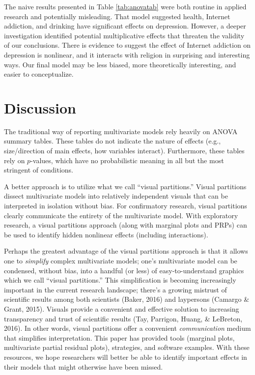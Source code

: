 \documentclass[
  man,floatsintext]{apa6}
\begin{document}
The naive results presented in Table \ref{tab:anovatab} were both routine in applied research and potentially misleading. That model suggested health, Internet addiction, and drinking have significant effects on depression. However, a deeper investigation identified potential multiplicative effects that threaten the validity of our conclusions. There is evidence to suggest the effect of Internet addiction on depression is nonlinear, and it interacts with religion in surprising and interesting ways. Our final model may be less biased, more theoretically interesting, and easier to conceptualize.

\section{Discussion}\label{discussion}

The traditional way of reporting multivariate models rely heavily on ANOVA summary tables. These tables do not indicate the nature of effects (e.g., size/direction of main effects, how variables interact). Furthermore, these tables rely on \(p\)-values, which have no probabilistic meaning in all but the most stringent of conditions.

A better approach is to utilize what we call ``visual partitions.'' Visual partitions dissect multivariate models into relatively independent visuals that can be interpreted in isolation without bias. For confirmatory research, visual partitions clearly communicate the entirety of the multivariate model. With exploratory research, a visual partitions approach (along with marginal plots and PRPs) can be used to identify hidden nonlinear effects (including interactions).

Perhaps the greatest advantage of the visual partitions approach is that it allows one to \emph{simplify} complex multivariate models; one's multivariate model can be condensed, without bias, into a handful (or less) of easy-to-understand graphics which we call ``visual partitions.'' This simplification is becoming increasingly important in the current research landscape; there's a growing mistrust of scientific results among both scientists (Baker, 2016) and laypersons (Camargo \& Grant, 2015). Visuals provide a convenient and effective solution to increasing transparency and trust of scientific results (Tay, Parrigon, Huang, \& LeBreton, 2016). In other words, visual partitions offer a convenient \emph{communication} medium that simplifies interpretation. This paper has provided tools (marginal plots, multivariate partial residual plots), strategies, and software examples. With these resources, we hope researchers will better be able to identify important effects in their models that might otherwise have been missed.
\end{document}
